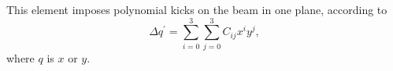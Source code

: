 This element imposes polynomial kicks on the beam in one plane, according
to
\begin{equation}
\Delta q^\prime = \sum_{i=0}^{3} \sum_{j=0}^{3} C_{ij} x^i y^j,
\end{equation}
where $q$ is $x$ or $y$.

